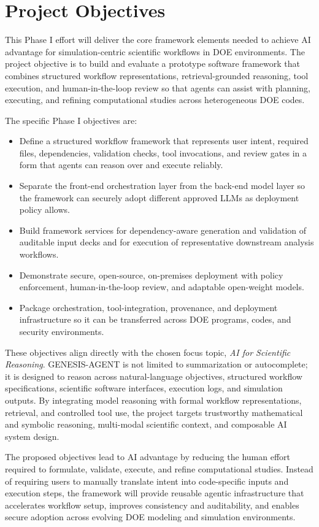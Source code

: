 \documentclass[11pt]{article} \usepackage[margin=1in]{geometry}
\begin{document}
\section{Project Objectives}
This Phase I effort will deliver the core framework elements needed to achieve
AI advantage for simulation-centric scientific workflows in DOE environments.
The project objective is to build and evaluate a prototype software framework
that combines structured workflow representations, retrieval-grounded
reasoning, tool execution, and human-in-the-loop review so that agents can
assist with planning, executing, and refining computational studies across
heterogeneous DOE codes.

The specific Phase I objectives are:
\begin{itemize}
\item Define a structured workflow framework that represents user intent,
required files, dependencies, validation checks, tool invocations, and review
gates in a form that agents can reason over and execute reliably.
\item Separate the front-end orchestration layer from the back-end model layer
so the framework can securely adopt different approved LLMs as deployment
policy allows.
\item Build framework services for dependency-aware generation and validation of
auditable input decks and for execution of representative downstream analysis
workflows.
\item Demonstrate secure, open-source, on-premises deployment with policy
enforcement, human-in-the-loop review, and adaptable open-weight models.
\item Package orchestration, tool-integration, provenance, and deployment
infrastructure so it can be transferred across DOE programs, codes, and
security environments.
\end{itemize}

These objectives align directly with the chosen focus topic, \textit{AI for
Scientific Reasoning}. GENESIS-AGENT is not limited to summarization or
autocomplete; it is designed to reason across natural-language objectives,
structured workflow specifications, scientific software interfaces, execution
logs, and simulation outputs. By integrating model reasoning with formal
workflow representations, retrieval, and controlled tool use, the project
targets trustworthy mathematical and symbolic reasoning, multi-modal scientific
context, and composable AI system design.

The proposed objectives lead to AI advantage by reducing the human effort
required to formulate, validate, execute, and refine computational studies.
Instead of requiring users to manually translate intent into code-specific
inputs and execution steps, the framework will provide reusable agentic
infrastructure that accelerates workflow setup, improves consistency and
auditability, and enables secure adoption across evolving DOE modeling and
simulation environments.
\end{document}
